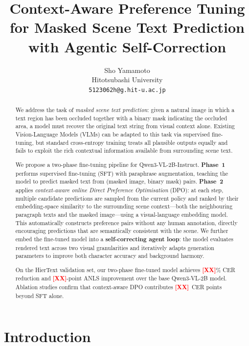 \documentclass[uplatex,10pt,twocolumn,a4paper]{article}
\title{
  \vspace{-6mm}
  \Large\textbf{Context-Aware Preference Tuning for Masked Scene Text Prediction\\
  with Agentic Self-Correction}
}
\author{
  Sho Yamamoto\\
  \small Hitotsubashi University\\
  \small \texttt{5123062h@g.hit-u.ac.jp}
}
\date{}
\newcommand{\TODO}[1]{\textcolor{red}{\textbf{[#1]}}}
\begin{document}

\maketitle
\thispagestyle{empty}

\begin{abstract}
We address the task of \emph{masked scene text prediction}: given a
natural image in which a text region has been occluded together with a
binary mask indicating the occluded area, a model must recover the
original text string from visual context alone.
Existing Vision-Language Models (VLMs) can be adapted to this task via
supervised fine-tuning, but standard cross-entropy training treats all
plausible outputs equally and fails to exploit the rich contextual
information available from surrounding scene text.

We propose a two-phase fine-tuning pipeline for Qwen3-VL-2B-Instruct.
\textbf{Phase~1} performs supervised fine-tuning (SFT) with paraphrase
augmentation, teaching the model to predict masked text from
(masked image, binary mask) pairs.
\textbf{Phase~2} applies \emph{context-aware online Direct Preference
Optimisation} (DPO): at each step, multiple candidate predictions are
sampled from the current policy and ranked by their embedding-space
similarity to the surrounding scene context---both the neighbouring
paragraph texts and the masked image---using a visual-language embedding
model.
This automatically constructs preference pairs without any human
annotation, directly encouraging predictions that are semantically
consistent with the scene.
We further embed the fine-tuned model into a \textbf{self-correcting
agent loop}: the model evaluates rendered text across two visual
granularities and iteratively adapts generation parameters to improve
both character accuracy and background harmony.

On the HierText validation set, our two-phase fine-tuned model achieves
\TODO{XX}\% CER reduction and \TODO{XX}-point ANLS improvement over the
base Qwen3-VL-2B model.
Ablation studies confirm that context-aware DPO contributes
\TODO{XX}~CER points beyond SFT alone.

\end{abstract}

\section{Introduction}
\label{sec:intro}
\end{document}
